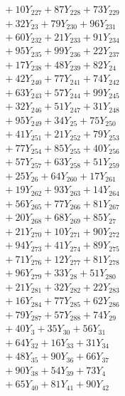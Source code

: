 \documentclass[a4paper,10pt]{article}
\begin{document}
{\begin{align}
&\quad  + 10Y_{227} + 87Y_{228} + 73Y_{229} \\[0.5ex]
&\quad  + 32Y_{23} + 79Y_{230} + 96Y_{231} \\[0.5ex]
&\quad  + 60Y_{232} + 21Y_{233} + 91Y_{234} \\[0.5ex]
&\quad  + 95Y_{235} + 99Y_{236} + 22Y_{237} \\[0.5ex]
&\quad  + 17Y_{238} + 48Y_{239} + 82Y_{24} \\[0.5ex]
&\quad  + 42Y_{240} + 77Y_{241} + 74Y_{242} \\[0.5ex]
&\quad  + 63Y_{243} + 57Y_{244} + 99Y_{245} \\[0.5ex]
&\quad  + 32Y_{246} + 51Y_{247} + 31Y_{248} \\[0.5ex]
&\quad  + 95Y_{249} + 34Y_{25} + 75Y_{250} \\[0.5ex]
&\quad  + 41Y_{251} + 21Y_{252} + 79Y_{253} \\[0.5ex]
&\quad  + 77Y_{254} + 85Y_{255} + 40Y_{256} \\[0.5ex]
&\quad  + 57Y_{257} + 63Y_{258} + 51Y_{259} \\[0.5ex]
&\quad  + 25Y_{26} + 64Y_{260} + 17Y_{261} \\[0.5ex]
&\quad  + 19Y_{262} + 93Y_{263} + 14Y_{264} \\[0.5ex]
&\quad  + 56Y_{265} + 77Y_{266} + 81Y_{267} \\[0.5ex]
&\quad  + 20Y_{268} + 68Y_{269} + 85Y_{27} \\[0.5ex]
&\quad  + 21Y_{270} + 10Y_{271} + 90Y_{272} \\[0.5ex]
&\quad  + 94Y_{273} + 41Y_{274} + 89Y_{275} \\[0.5ex]
&\quad  + 71Y_{276} + 12Y_{277} + 81Y_{278} \\[0.5ex]
&\quad  + 96Y_{279} + 33Y_{28} + 51Y_{280} \\[0.5ex]
&\quad  + 21Y_{281} + 32Y_{282} + 22Y_{283} \\[0.5ex]
&\quad  + 16Y_{284} + 77Y_{285} + 62Y_{286} \\[0.5ex]
&\quad  + 79Y_{287} + 57Y_{288} + 74Y_{29} \\[0.5ex]
&\quad  + 40Y_{3} + 35Y_{30} + 56Y_{31} \\[0.5ex]
&\quad  + 64Y_{32} + 16Y_{33} + 31Y_{34} \\[0.5ex]
&\quad  + 48Y_{35} + 90Y_{36} + 66Y_{37} \\[0.5ex]
&\quad  + 90Y_{38} + 54Y_{39} + 73Y_{4} \\[0.5ex]
&\quad  + 65Y_{40} + 81Y_{41} + 90Y_{42} \\[0.5ex]

\end{align}}
\end{document}
